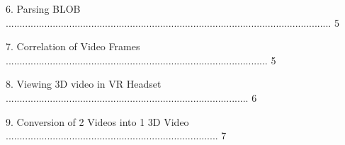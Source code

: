 \documentclass[10pt,draftclsnofoot,onecolumn]{IEEEtran}
\newcommand\tab[1][1cm]{\hspace*{#1}}
\begin{document}
\tab 6. Parsing BLOB ...................................................................................................................... 5\\
                 \vspace{2mm}

\tab 7. Correlation of Video Frames ............................................................................................... 5\\
                 \vspace{2mm}


\tab 8. Viewing 3D video in VR Headset ........................................................................................ 6\\
                 \vspace{2mm}

\tab 9. Conversion of 2 Videos into 1 3D Video ............................................................................. 7\\
                 \vspace{2mm}
\end{document}
